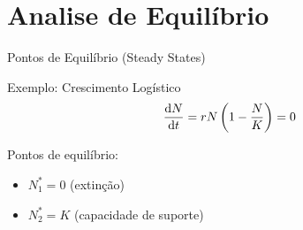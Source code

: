 \section{Analise de Equilíbrio}

\begin{frame}[shrink=5]{Pontos de Equilíbrio (Steady States)}

\vspace{0.3cm}

\begin{exampleblock}{Exemplo: Crescimento Logístico}
\begin{equation*}
\frac{\mathrm{d} N}{\mathrm{d} t} = rN\left(1 - \frac{N}{K}\right) = 0
\end{equation*}

Pontos de equilíbrio:
\begin{itemize}
    \item $N^*_1 = 0$ (extinção)
    \item $N^*_2 = K$ (capacidade de suporte)
\end{itemize}
\end{exampleblock}
\end{frame}

